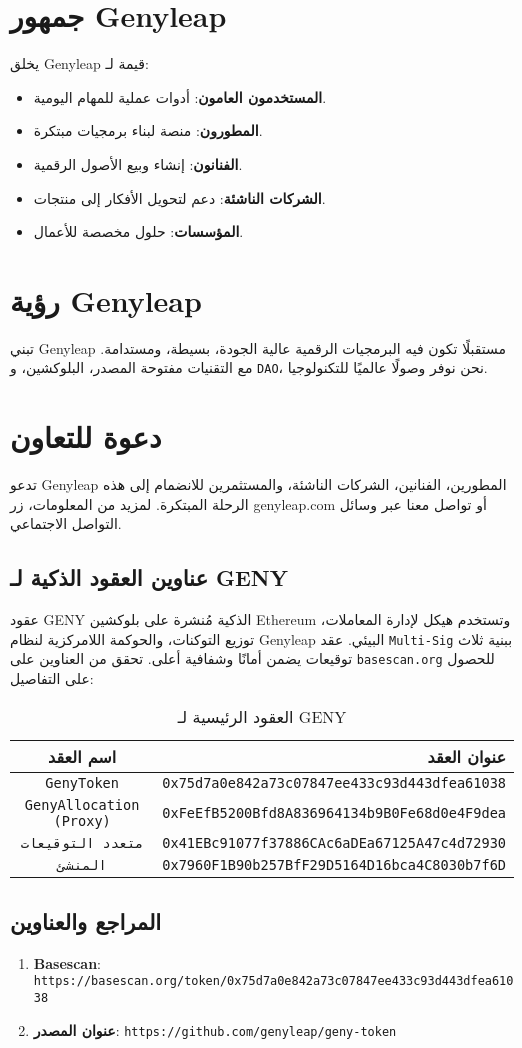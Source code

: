 \documentclass[a4paper,12pt,openany]{book}
\begin{document}
\chapter{جمهور Genyleap}
يخلق Genyleap قيمة لـ:
\begin{itemize}
    \item \textbf{المستخدمون العامون}: أدوات عملية للمهام اليومية.
    \item \textbf{المطورون}: منصة لبناء برمجيات مبتكرة.
    \item \textbf{الفنانون}: إنشاء وبيع الأصول الرقمية.
    \item \textbf{الشركات الناشئة}: دعم لتحويل الأفكار إلى منتجات.
    \item \textbf{المؤسسات}: حلول مخصصة للأعمال.
\end{itemize}

\chapter{رؤية Genyleap}
تبني Genyleap مستقبلًا تكون فيه البرمجيات الرقمية عالية الجودة، بسيطة، ومستدامة. مع التقنيات مفتوحة المصدر، البلوكشين، و \texttt{DAO}، نحن نوفر وصولًا عالميًا للتكنولوجيا.

\chapter{دعوة للتعاون}
تدعو Genyleap المطورين، الفنانين، الشركات الناشئة، والمستثمرين للانضمام إلى هذه الرحلة المبتكرة. لمزيد من المعلومات، زر genyleap.com أو تواصل معنا عبر وسائل التواصل الاجتماعي.

\section*{عناوين العقود الذكية لـ GENY}
عقود GENY الذكية مُنشرة على بلوكشين Ethereum وتستخدم هيكل  لإدارة المعاملات، توزيع التوكنات، والحوكمة اللامركزية لنظام Genyleap البيئي. عقد \texttt{Multi-Sig} ببنية ثلاث توقيعات يضمن أمانًا وشفافية أعلى. تحقق من العناوين على \texttt{basescan.org} للحصول على التفاصيل:

\begin{table}[h]
\centering
\caption*{العقود الرئيسية لـ GENY}
\small
\begin{tabular}{c r}
\hline
\textbf{اسم العقد} & \textbf{عنوان العقد} \\
\hline
\texttt{GenyToken} & {\texttt{0x75d7a0e842a73c07847ee433c93d443dfea61038}} \\
\texttt{GenyAllocation (Proxy)} & {\texttt{0xFeEfB5200Bfd8A836964134b9B0Fe68d0e4F9dea}} \\
\texttt{متعدد التوقيعات} & {\texttt{0x41EBc91077f37886CAc6aDEa67125A47c4d72930}} \\
\texttt{المنشئ} & {\texttt{0x7960F1B90b257BfF29D5164D16bca4C8030b7f6D}} \\
\hline
\end{tabular}
\end{table}

\section*{المراجع والعناوين}

\begin{enumerate}
    \item \textbf{Basescan}: \texttt{https://basescan.org/token/0x75d7a0e842a73c07847ee433c93d443dfea61038}
    \item \textbf{عنوان المصدر}: \texttt{https://github.com/genyleap/geny-token}
\end{enumerate}
\end{document}
